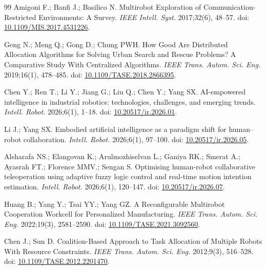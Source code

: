 \documentclass[type=submission,name=IR]{oae}
\begin{document}
\begin{thebibliography}{99}
Amigoni F.; Banfi J.; Basilico N.
Multirobot Exploration of Communication-Restricted Environments: A Survey.
\textit{IEEE Intell. Syst.} 2017;32(6), 48--57.
doi: \href{https://doi.org/10.1109/MIS.2017.4531226}{10.1109/MIS.2017.4531226}.

Geng N.; Meng Q.; Gong D.; Chung PWH.
How Good Are Distributed Allocation Algorithms for Solving Urban Search and Rescue Problems? A Comparative Study With Centralized Algorithms.
\textit{IEEE Trans. Autom. Sci. Eng.} 2019;16(1), 478--485.
doi: \href{https://doi.org/10.1109/TASE.2018.2866395}{10.1109/TASE.2018.2866395}.

Chen Y.; Ren T.; Li Y.; Jiang G.; Liu Q.; Chen Y.; Yang SX.
AI-empowered intelligence in industrial robotics: technologies, challenges, and emerging trends.
\textit{Intell. Robot.} 2026;6(1), 1--18.
doi: \href{https://doi.org/10.20517/ir.2026.01}{10.20517/ir.2026.01}.

Li J.; Yang SX.
Embodied artificial intelligence as a paradigm shift for human--robot collaboration.
\textit{Intell. Robot.} 2026;6(1), 97--100.
doi: \href{https://doi.org/10.20517/ir.2026.05}{10.20517/ir.2026.05}.

Alsharafa NS.; Elangovan K.; Arulmozhiselvan L.; Ganiya RK.; Smerat A.; Ayasrah FT.; Florence MMV.; Sengan S.
Optimising human-robot collaborative teleoperation using adaptive fuzzy logic control and real-time motion intention estimation.
\textit{Intell. Robot.} 2026;6(1), 120--147.
doi: \href{https://doi.org/10.20517/ir.2026.07}{10.20517/ir.2026.07}.

Huang B.; Yang Y.; Tsai YY.; Yang GZ.
A Reconfigurable Multirobot Cooperation Workcell for Personalized Manufacturing.
\textit{IEEE Trans. Autom. Sci. Eng.} 2022;19(3), 2581--2590.
doi: \href{https://doi.org/10.1109/TASE.2021.3092560}{10.1109/TASE.2021.3092560}.

Chen J.; Sun D.
Coalition-Based Approach to Task Allocation of Multiple Robots With Resource Constraints.
\textit{IEEE Trans. Autom. Sci. Eng.} 2012;9(3), 516--528.
doi: \href{https://doi.org/10.1109/TASE.2012.2201470}{10.1109/TASE.2012.2201470}.


\end{thebibliography}
\end{document}
